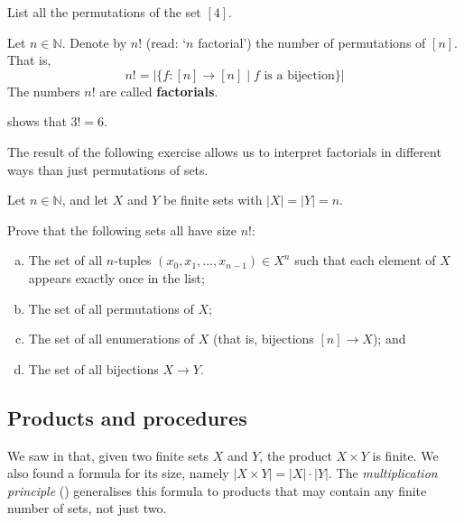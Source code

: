 \begin{exercise}
List all the permutations of the set $[4]$.
\end{exercise}

\begin{definition}
\label{defFactorial}
Let $n \in \mathbb{N}$. Denote by $n!$ (read: `$n$ factorial') the number of permutations of $[n]$. That is,
\[ n! = |\{ f : [n] \to [n] \mid f \text{ is a bijection} \}| \]
The numbers $n!$ are called \textbf{factorials}.
\end{definition}

\begin{example}
 shows that $3!=6$.
\end{example}

The result of the following exercise allows us to interpret factorials in different ways than just permutations of sets.

\begin{exercise}
\label{exOtherCharacterisationsOfFactorial}
Let $n \in \mathbb{N}$, and let $X$ and $Y$ be finite sets with $|X|=|Y|=n$.

Prove that the following sets all have size $n!$:
\begin{enumerate}[(a)]
\item The set of all $n$-tuples $(x_0,x_1,\dots,x_{n-1}) \in X^n$ such that each element of $X$ appears exactly once in the list;
\item The set of all permutations of $X$;
\item The set of all enumerations of $X$ (that is, bijections $[n] \to X$); and
\item The set of all bijections $X \to Y$.
\end{enumerate}
\end{exercise}

\subsection*{Products and procedures}

We saw in  that, given two finite sets $X$ and $Y$, the product $X \times Y$ is finite. We also found a formula for its size, namely $|X \times Y| = |X| \cdot |Y|$. The \textit{multiplication principle} () generalises this formula to products that may contain any finite number of sets, not just two.


